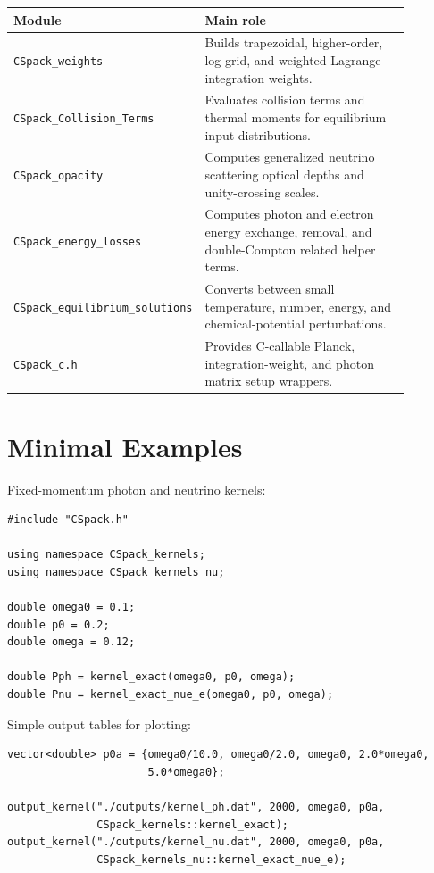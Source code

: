 \documentclass[11pt]{article}
\begin{document}
\begin{center}
\small
\begin{tabular}{L{0.34\linewidth}L{0.54\linewidth}}
\toprule
Module & Main role \\
\midrule
\texttt{CSpack\_weights} & Builds trapezoidal, higher-order, log-grid, and weighted Lagrange integration weights. \\
\texttt{CSpack\_Collision\_Terms} & Evaluates collision terms and thermal moments for equilibrium input distributions. \\
\texttt{CSpack\_opacity} & Computes generalized neutrino scattering optical depths and unity-crossing scales. \\
\texttt{CSpack\_energy\_losses} & Computes photon and electron energy exchange, removal, and double-Compton related helper terms. \\
\texttt{CSpack\_equilibrium\_solutions} & Converts between small temperature, number, energy, and chemical-potential perturbations. \\
\texttt{CSpack\_c.h} & Provides C-callable Planck, integration-weight, and photon matrix setup wrappers. \\
\bottomrule
\end{tabular}
\end{center}

\section{Minimal Examples}

Fixed-momentum photon and neutrino kernels:
\begin{verbatim}
#include "CSpack.h"

using namespace CSpack_kernels;
using namespace CSpack_kernels_nu;

double omega0 = 0.1;
double p0 = 0.2;
double omega = 0.12;

double Pph = kernel_exact(omega0, p0, omega);
double Pnu = kernel_exact_nue_e(omega0, p0, omega);
\end{verbatim}

Simple output tables for plotting:
\begin{verbatim}
vector<double> p0a = {omega0/10.0, omega0/2.0, omega0, 2.0*omega0,
                      5.0*omega0};

output_kernel("./outputs/kernel_ph.dat", 2000, omega0, p0a,
              CSpack_kernels::kernel_exact);
output_kernel("./outputs/kernel_nu.dat", 2000, omega0, p0a,
              CSpack_kernels_nu::kernel_exact_nue_e);
\end{verbatim}
\end{document}
